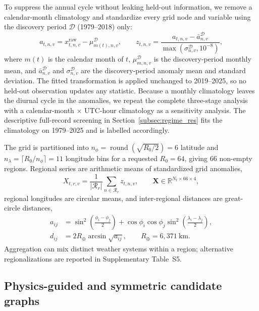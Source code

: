 \documentclass[preprint,12pt]{elsarticle}
\begin{document}
To suppress the annual cycle without leaking held-out information, we remove a calendar-month climatology and standardize every grid node and variable using the discovery period $\mathcal{D}$ (1979--2018) only:
\begin{equation}
a_{t,n,v}=x^{\mathrm{raw}}_{t,n,v}-\mu^{\mathcal{D}}_{m(t),n,v},\qquad
z_{t,n,v}=\frac{a_{t,n,v}-\bar{a}^{\mathcal{D}}_{n,v}}{\max\left(\sigma^{\mathcal{D}}_{n,v},10^{-8}\right)},
\end{equation}
where $m(t)$ is the calendar month of $t$, $\mu^{\mathcal{D}}_{m,n,v}$ is the discovery-period monthly mean, and $\bar{a}^{\mathcal{D}}_{n,v}$ and $\sigma^{\mathcal{D}}_{n,v}$ are the discovery-period anomaly mean and standard deviation. The fitted transformation is applied unchanged to 2019--2025, so no held-out observation updates any statistic. Because a monthly climatology leaves the diurnal cycle in the anomalies, we repeat the complete three-stage analysis with a calendar-month $\times$ UTC-hour climatology as a sensitivity analysis. The descriptive full-record screening in Section~\ref{subsec:regime_res} fits the climatology on 1979--2025 and is labelled accordingly.

The grid is partitioned into $n_\phi=\operatorname{round}(\sqrt{R_0/2})=6$ latitude and $n_\lambda=\lceil R_0/n_\phi\rceil=11$ longitude bins for a requested $R_0=64$, giving 66 non-empty regions. Regional series are arithmetic means of standardized grid anomalies,
\begin{equation}
X_{t,r,v}=\frac{1}{|\mathcal{R}_r|}\sum_{n\in\mathcal{R}_r}z_{t,n,v},\qquad \mathbf{X}\in\mathbb{R}^{N_t\times66\times4},
\end{equation}
regional longitudes are circular means, and inter-regional distances are great-circle distances,
\begin{align}
a_{ij}&=\sin^{2}\!\left(\tfrac{\phi_i-\phi_j}{2}\right)+\cos\phi_i\cos\phi_j\sin^{2}\!\left(\tfrac{\lambda_i-\lambda_j}{2}\right),\\
d_{ij}&=2R_{\oplus}\arcsin\sqrt{a_{ij}},\qquad R_{\oplus}=6{,}371\ \mathrm{km}.
\end{align}
Aggregation can mix distinct weather systems within a region; alternative regionalizations are reported in Supplementary Table~S5.

\subsection{Physics-guided and symmetric candidate graphs}
\end{document}
